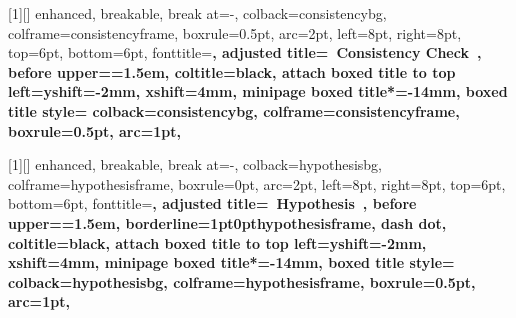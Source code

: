 [1][]{%
  enhanced,
  breakable,
  break at=-\baselineskip,
  colback=consistencybg,
  colframe=consistencyframe,
  boxrule=0.5pt,
  arc=2pt,
  left=8pt,
  right=8pt,
  top=6pt,
  bottom=6pt,
  fonttitle=\bfseries\sffamily,
  adjusted title={\consistencyicon~Consistency Check~\theconsistencycounter{}},
  before upper={\parindent=1.5em},
  coltitle=black,
  attach boxed title to top left={yshift=-2mm, xshift=4mm},
  minipage boxed title*=-14mm,
  boxed title style={
    colback=consistencybg,
    colframe=consistencyframe,
    boxrule=0.5pt,
    arc=1pt,
      }
}


[1][]{%
  enhanced,
  breakable,
  break at=-\baselineskip,
  colback=hypothesisbg,
  colframe=hypothesisframe,
  boxrule=0pt,
  arc=2pt,
  left=8pt,
  right=8pt,
  top=6pt,
  bottom=6pt,
  fonttitle=\bfseries\sffamily,
  adjusted title={\hypothesisicon~Hypothesis~\thehypothesiscounter{}},
  before upper={\parindent=1.5em},
  borderline={1pt}{0pt}{hypothesisframe, dash dot},
  coltitle=black,
  attach boxed title to top left={yshift=-2mm, xshift=4mm},
  minipage boxed title*=-14mm,
  boxed title style={
    colback=hypothesisbg,
    colframe=hypothesisframe,
    boxrule=0.5pt,
    arc=1pt,
      }
}

%
%

